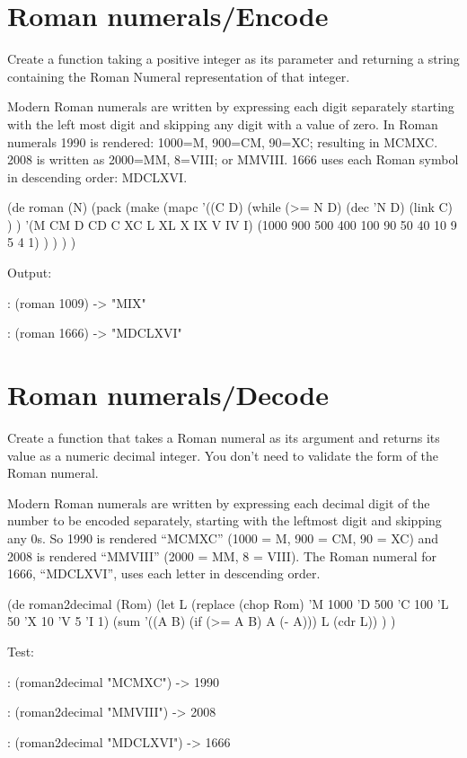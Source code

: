 \pagebreak{}
\section*{Roman numerals/Encode}

Create a function taking a positive integer as its parameter and
returning a string containing the Roman Numeral representation of that
integer.

Modern Roman numerals are written by expressing each digit separately
starting with the left most digit and skipping any digit with a value of
zero. In Roman numerals 1990 is rendered: 1000=M, 900=CM, 90=XC;
resulting in MCMXC. 2008 is written as 2000=MM, 8=VIII; or MMVIII. 1666
uses each Roman symbol in descending order: MDCLXVI.

\begin{wideverbatim}

(de roman (N)
   (pack
      (make
         (mapc
            '((C D)
               (while (>= N D)
                  (dec 'N D)
                  (link C) ) )
            '(M CM D CD C XC L XL X IX V IV I)
            (1000 900 500 400 100 90 50 40 10 9 5 4 1) ) ) ) )

Output:

: (roman 1009)
-> "MIX"

: (roman 1666)
-> "MDCLXVI"

\end{wideverbatim}

\pagebreak{}
\section*{Roman numerals/Decode}

Create a function that takes a Roman numeral as its argument and returns
its value as a numeric decimal integer. You don't need to validate the
form of the Roman numeral.

Modern Roman numerals are written by expressing each decimal digit of
the number to be encoded separately, starting with the leftmost digit
and skipping any 0s. So 1990 is rendered ``MCMXC'' (1000 = M, 900 = CM,
90 = XC) and 2008 is rendered ``MMVIII'' (2000 = MM, 8 = VIII). The
Roman numeral for 1666, ``MDCLXVI'', uses each letter in descending
order.



\begin{wideverbatim}

(de roman2decimal (Rom)
   (let L (replace (chop Rom) 'M 1000 'D 500 'C 100 'L 50 'X 10 'V 5 'I 1)
      (sum '((A B) (if (>= A B) A (- A))) L (cdr L)) ) )

Test:

: (roman2decimal "MCMXC")
-> 1990

: (roman2decimal "MMVIII")
-> 2008

: (roman2decimal "MDCLXVI")
-> 1666

\end{wideverbatim}

